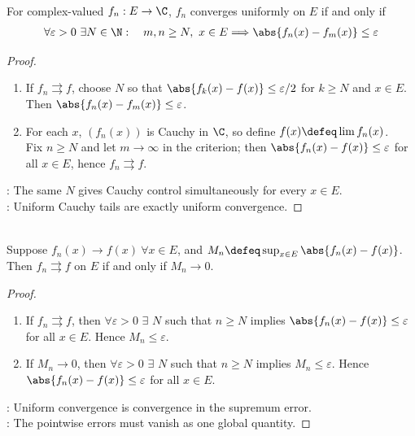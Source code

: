 \begin{theorem} \label{thm:uniform-cauchy-criterion} \\
For complex-valued $f_n:E\to\C$, $f_n$ converges uniformly on $E$ if and only if
\begin{align}
\forall\varepsilon>0\ \exists N\in\N:\quad m,n\geq N,\ x\in E \Longrightarrow \abs{f_n(x)-f_m(x)}\leq\varepsilon \nonumber
\end{align}
\begin{proof}
\begin{enumerate}[label=\roman*.]
\setlength{\itemsep}{0pt}
\item[$(\Rightarrow)$] If $f_n\rightrightarrows f$, choose $N$ so that $\abs{f_k(x)-f(x)}\leq\varepsilon/2$ for $k\geq N$ and $x\in E$. Then $\abs{f_n(x)-f_m(x)}\leq\varepsilon$.
\item[$(\Leftarrow)$] For each $x$, $(f_n(x))$ is Cauchy in $\C$, so define $f(x)\defeq\lim f_n(x)$.\\
Fix $n\geq N$ and let $m\to\infty$ in the criterion; then $\abs{f_n(x)-f(x)}\leq\varepsilon$ for all $x\in E$, hence $f_n\rightrightarrows f$.
\end{enumerate}
: The same $N$ gives Cauchy control simultaneously for every $x\in E$.\\
: Uniform Cauchy tails are exactly uniform convergence.
\end{proof}
\end{theorem}

\begin{theorem} \label{thm:uniform-convergence-supremum-test} \\
Suppose $f_n(x)\to f(x) \ \forall x\in E$, and $M_n\defeq\sup_{x\in E}\abs{f_n(x)-f(x)}$. Then $f_n\rightrightarrows f$ on $E$ if and only if $M_n\to0$.
\begin{proof}
\begin{enumerate}[label=\roman*.]
\setlength{\itemsep}{0pt}
\item[$(\Rightarrow)$] If $f_n\rightrightarrows f$, then $\forall \varepsilon>0$ $\exists$ $N$ such that $n\geq N$ implies $\abs{f_n(x)-f(x)}\leq\varepsilon$ for all $x\in E$. Hence $M_n\leq\varepsilon$.
\item[$(\Leftarrow)$] If $M_n\to0$, then $\forall  \varepsilon>0$ $\exists$ $N$ such that $n\geq N$ implies $M_n\leq\varepsilon$. Hence $\abs{f_n(x)-f(x)}\leq\varepsilon$ for all $x\in E$.
\end{enumerate}
: Uniform convergence is convergence in the supremum error.\\
: The pointwise errors must vanish as one global quantity.
\end{proof}
\end{theorem}

